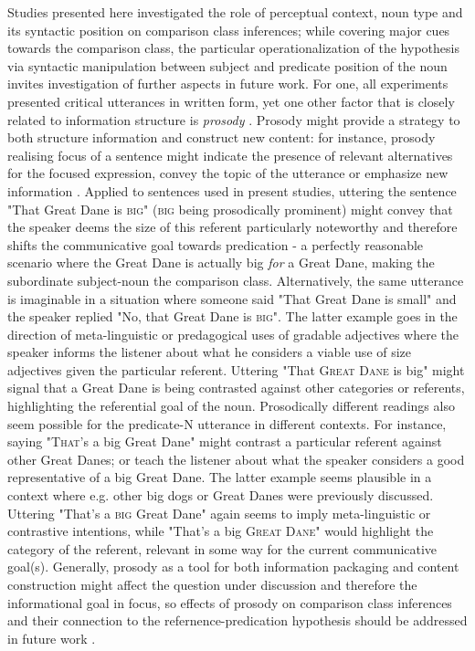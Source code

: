 Studies presented here investigated the role of perceptual context, noun type and its syntactic position on comparison class inferences; while covering major cues towards the comparison class, the particular operationalization of the hypothesis via syntactic manipulation between subject and predicate position of the noun invites investigation of further aspects in future work. For one, all experiments presented critical utterances in written form, yet one other factor that is closely related to information structure is \emph{prosody} \parencite{krifka2008basic}. Prosody might provide a strategy to both structure information and construct new content: for instance, prosody realising focus of a sentence might indicate the presence of relevant alternatives for the focused expression, convey the topic of the utterance or emphasize new information \parencite{krifka2008basic, selkirk1995sentence}. 
Applied to sentences used in present studies, uttering the sentence "That Great Dane is \textsc{big}" (\textsc{big} being prosodically prominent) might convey that the speaker deems the size of this referent particularly noteworthy and therefore shifts the communicative goal towards predication - a perfectly reasonable scenario where the Great Dane is actually big \emph{for} a Great Dane, making the subordinate subject-noun the comparison class.  Alternatively, the same utterance is imaginable in a situation where someone said "That Great Dane is small" and the speaker replied "No, that Great Dane is \textsc{big}". The latter example goes in the direction of meta-linguistic or predagogical uses of gradable adjectives where the speaker informs the listener about what he considers a viable use of size adjectives given the particular referent. Uttering "That \textsc{Great Dane} is big" might signal that a Great Dane is being contrasted against other categories or referents, highlighting the referential goal of the noun.
Prosodically different readings also seem possible for the predicate-N utterance in different contexts. For instance, saying "\textsc{That}'s a big Great Dane" might contrast a particular referent against other Great Danes; or teach the listener about what the speaker considers a good representative of a big Great Dane. The latter example seems plausible in a context where e.g. other big dogs or Great Danes were previously discussed. Uttering "That's a \textsc{big} Great Dane" again seems to imply meta-linguistic or contrastive intentions, while "That's a big \textsc{Great Dane}" would highlight the category of the referent, relevant in some way for the current communicative goal(s). 
Generally, prosody as a tool for both information packaging and content construction might affect the question under discussion and therefore the informational goal in focus, so effects of prosody on comparison class inferences and their connection to the refernence-predication hypothesis should be addressed in future work \parencite[cf.][]{krifka2008basic}. 

